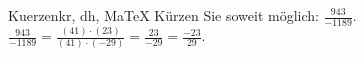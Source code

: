 \begin{MAufgabe}{Kuerzen}{kr, dh, MaTeX}
K\"urzen Sie soweit m\"oglich: $\frac{943}{-1189}$.\\ 
\ifLsg\MLoesung
\quad $\frac{943}{-1189}=\frac{(41)\cdot(23)}{(41)\cdot(-29)}=\frac{23}{-29}=\frac{-23}{29}$.\else\relax\fi
 \end{MAufgabe}